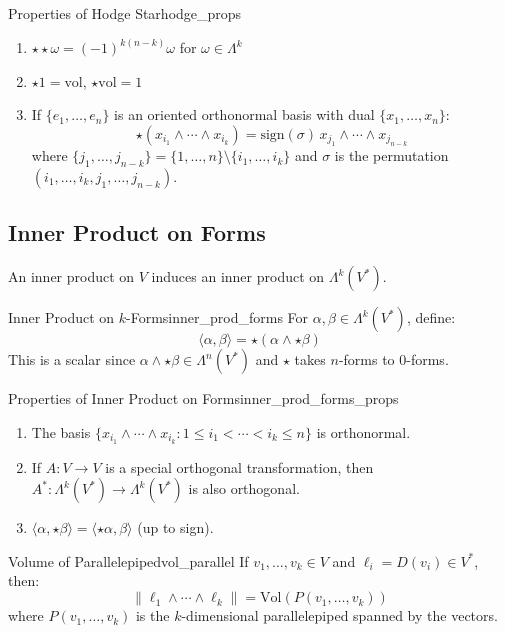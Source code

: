 \documentclass[11pt, letterpaper, openany]{book}
\begin{document}
\begin{thm}{Properties of Hodge Star}{hodge_props}
\begin{enumerate}
    \item $\star\star\omega = (-1)^{k(n-k)} \omega$ for $\omega \in \Lambda^k$
    \item $\star 1 = \text{vol}$, $\star\text{vol} = 1$
    \item If $\{e_1, \ldots, e_n\}$ is an oriented orthonormal basis with dual $\{x_1, \ldots, x_n\}$:
    \[\star(x_{i_1} \wedge \cdots \wedge x_{i_k}) = \text{sign}(\sigma) \, x_{j_1} \wedge \cdots \wedge x_{j_{n-k}}\]
    where $\{j_1, \ldots, j_{n-k}\} = \{1, \ldots, n\} \setminus \{i_1, \ldots, i_k\}$ and $\sigma$ is the permutation $(i_1, \ldots, i_k, j_1, \ldots, j_{n-k})$.
\end{enumerate}
\end{thm}

\subsection{Inner Product on Forms}

An inner product on $V$ induces an inner product on $\Lambda^k(V^*)$.

\begin{defn}{Inner Product on $k$-Forms}{inner_prod_forms}
For $\alpha, \beta \in \Lambda^k(V^*)$, define:
\[\langle \alpha, \beta \rangle = \star(\alpha \wedge \star\beta)\]
This is a scalar since $\alpha \wedge \star\beta \in \Lambda^n(V^*)$ and $\star$ takes $n$-forms to $0$-forms.
\end{defn}

\begin{thm}{Properties of Inner Product on Forms}{inner_prod_forms_props}
\begin{enumerate}
    \item The basis $\{x_{i_1} \wedge \cdots \wedge x_{i_k} : 1 \leq i_1 < \cdots < i_k \leq n\}$ is orthonormal.
    \item If $A: V \to V$ is a special orthogonal transformation, then $A^*: \Lambda^k(V^*) \to \Lambda^k(V^*)$ is also orthogonal.
    \item $\langle \alpha, \star\beta \rangle = \langle \star\alpha, \beta \rangle$ (up to sign).
\end{enumerate}
\end{thm}

\begin{thm}{Volume of Parallelepiped}{vol_parallel}
If $v_1, \ldots, v_k \in V$ and $\ell_i = D(v_i) \in V^*$, then:
\[\|\ell_1 \wedge \cdots \wedge \ell_k\| = \text{Vol}(P(v_1, \ldots, v_k))\]
where $P(v_1, \ldots, v_k)$ is the $k$-dimensional parallelepiped spanned by the vectors.
\end{thm}
\end{document}
